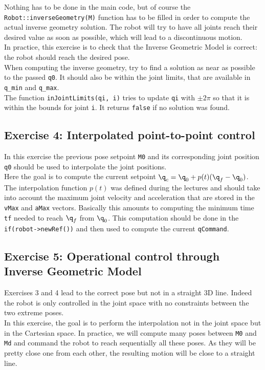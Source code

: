 \documentclass{ecnreport}
\begin{document}
Nothing has to be done in the main code, but of course the \texttt{Robot::inverseGeometry(M)} function has to be filled in order to compute the actual inverse geometry solution. The robot will try to have all joints reach their desired value as soon as possible, which will lead to a discontinuous motion.\\

In practice, this exercise is to check that the Inverse Geometric Model is correct: the robot should reach the desired pose.\\

When computing the inverse geometry, try to find a solution as near as possible to the passed \texttt{q0}. It should also be within the joint limits, that are available in \texttt{q\_min} and \texttt{q\_max}.\\

The function \texttt{inJointLimits(qi, i)} tries to update \texttt{qi} with $\pm 2\pi$ so that it is within the bounds for joint \texttt{i}. It returns \texttt{false} if no solution was found.

\subsection*{Exercise 4: Interpolated point-to-point control}

In this exercise the previous pose setpoint \texttt{M0} and its corresponding joint position \texttt{q0} should be used to interpolate the joint positions.\\

Here the goal is to compute the current setpoint $\q_c = \q_0 + p(t)(\q_f-\q_0)$. The interpolation function $p(t)$ was defined during the lectures and should take into account the maximum joint velocity and acceleration that are stored in the \texttt{vMax} and \texttt{aMax} vectors. Basically this amounts to computing the minimum time \texttt{tf} needed to reach $\q_f$ from $\q_0$. This computation should be done in the \texttt{if(robot->newRef())} and then used to compute the current \texttt{qCommand}.


\subsection*{Exercise 5: Operational control through Inverse Geometric Model}

Exercises 3 and 4 lead to the correct pose but not in a straight 3D line. Indeed the robot is only controlled in the joint space with no constraints between the two extreme poses.\\
In this exercise, the goal is to perform the interpolation not in the joint space but in the Cartesian space. In practice, we will compute many poses between 
\texttt{M0} and \texttt{Md} and command the robot to reach sequentially all these poses. As they will be pretty close one from each other, the resulting motion 
will be close to a straight line.
\end{document}
